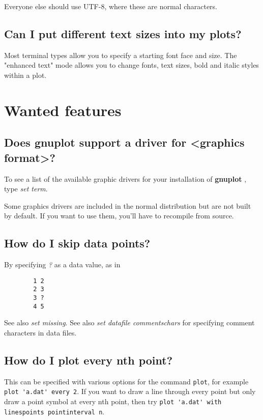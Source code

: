 \documentclass[a4paper,11pt]{article}
\newcommand{\gnuplot}{\textbf{gnuplot }}
\begin{document}
Everyone else should use UTF-8, where these are normal characters.

\subsection{Can I put different text sizes into my plots?}

Most terminal types allow you to specify a starting font face and size.
The "enhanced text" mode allows you to change fonts, text sizes, bold and
italic styles within a plot.



\section{Wanted features}

\subsection{Does \gnuplot support a driver for <graphics format>?}

To see a list of the available graphic drivers for your installation of
\gnuplot, type {\em set term}.

Some graphics drivers are included in the normal distribution
but are not built by default. If you want to use them, you'll
have to recompile from source.



\subsection{How do I skip data points?}

By specifying \textit{?} as a data value, as in
\small
\begin{verbatim}
        1 2
        2 3
        3 ?
        4 5
\end{verbatim}
\normalsize

See also \textit{set missing}.
See also \textit{set datafile commentschars} for specifying comment characters in
data files.


\subsection{How do I plot every nth point?}

This can be specified with various options for the command \verb+plot+,
for example \verb+plot 'a.dat' every 2+.  If you want to draw a line 
through every point but only draw a point symbol at every nth point,
then try \verb+plot 'a.dat' with linespoints pointinterval n+.
\end{document}
